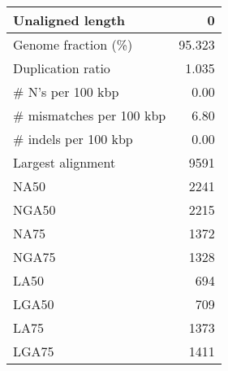 \documentclass[12pt,a4paper]{article}
\begin{document}
\begin{table}[ht]
\begin{center}
\begin{tabular}{|l*{1}{|r}|}
Unaligned length & 0 \\ \hline
Genome fraction (\%) & 95.323 \\ \hline
Duplication ratio & 1.035 \\ \hline
\# N's per 100 kbp & 0.00 \\ \hline
\# mismatches per 100 kbp & 6.80 \\ \hline
\# indels per 100 kbp & 0.00 \\ \hline
Largest alignment & 9591 \\ \hline
NA50 & 2241 \\ \hline
NGA50 & 2215 \\ \hline
NA75 & 1372 \\ \hline
NGA75 & 1328 \\ \hline
LA50 & 694 \\ \hline
LGA50 & 709 \\ \hline
LA75 & 1373 \\ \hline
LGA75 & 1411 \\ \hline
\end{tabular}
\end{center}
\end{table}
\end{document}
